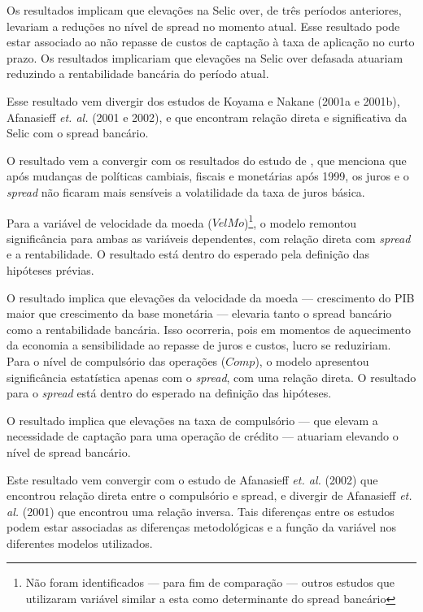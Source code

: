 \documentclass[
  12pt,
  12pt,
  openright,
  oneside,
  a4paper,
  chapter=TITLE,
  section=TITLE,
  subsection=TITLE,
  subsubsection=TITLE,
  portugues,
  sumario=tradicional]{abntex2}
\begin{document}
Os resultados implicam que elevações na Selic over, de três períodos anteriores, levariam a reduções no nível de spread no momento atual. Esse resultado pode estar associado ao não repasse de custos de captação à taxa de aplicação no curto prazo. Os resultados implicariam que elevações na Selic over defasada atuariam reduzindo a rentabilidade bancária do período atual.

Esse resultado vem divergir dos estudos de Koyama e Nakane (2001a e 2001b), Afanasieff \emph{et. al.} (2001 e 2002), \textcite{oreiro-2006} e \textcite{durigan:2018} que encontram relação direta e significativa da Selic com o spread bancário.

O resultado vem a convergir com os resultados do estudo de \textcite{BCB:1999}, que menciona que após mudanças de políticas cambiais, fiscais e monetárias após 1999, os juros e o \emph{spread} não ficaram mais sensíveis a volatilidade da taxa de juros básica.

Para a variável de velocidade da moeda (\(VelMo\))\footnote{Não foram identificados — para fim de comparação — outros estudos que utilizaram variável similar a esta como determinante do spread bancário}, o modelo remontou significância para ambas as variáveis dependentes, com relação direta com \emph{spread} e a rentabilidade. O resultado está dentro do esperado pela definição das hipóteses prévias.

O resultado implica que elevações da velocidade da moeda --- crescimento do PIB maior que crescimento da base monetária --- elevaria tanto o spread bancário como a rentabilidade bancária. Isso ocorreria, pois em momentos de aquecimento da economia a sensibilidade ao repasse de juros e custos, lucro se reduziriam.\\
Para o nível de compulsório das operações (\(Comp\)), o modelo apresentou significância estatística apenas com o \emph{spread}, com uma relação direta. O resultado para o \emph{spread} está dentro do esperado na definição das hipóteses.

O resultado implica que elevações na taxa de compulsório --- que elevam a necessidade de captação para uma operação de crédito --- atuariam elevando o nível de spread bancário.

Este resultado vem convergir com o estudo de Afanasieff \emph{et. al.} (2002) que encontrou relação direta entre o compulsório e spread, e divergir de Afanasieff \emph{et. al.} (2001) que encontrou uma relação inversa. Tais diferenças entre os estudos podem estar associadas as diferenças metodológicas e a função da variável nos diferentes modelos utilizados.
\end{document}
